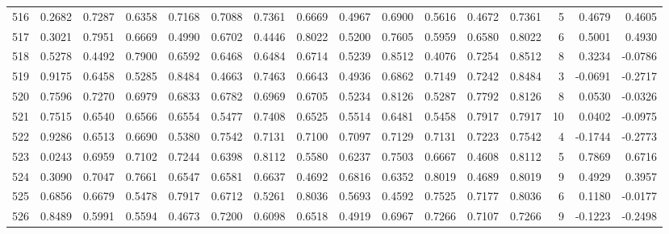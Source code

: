 \begin{tabular}{lrrrrrrrrrrrrrrr}
516 &      0.2682 &  0.7287 &  0.6358 &  0.7168 &  0.7088 &  0.7361 &  0.6669 &  0.4967 &  0.6900 &  0.5616 &   0.4672 &     0.7361 &      5 &                    0.4679 &                     0.4605 \\
517 &      0.3021 &  0.7951 &  0.6669 &  0.4990 &  0.6702 &  0.4446 &  0.8022 &  0.5200 &  0.7605 &  0.5959 &   0.6580 &     0.8022 &      6 &                    0.5001 &                     0.4930 \\
518 &      0.5278 &  0.4492 &  0.7900 &  0.6592 &  0.6468 &  0.6484 &  0.6714 &  0.5239 &  0.8512 &  0.4076 &   0.7254 &     0.8512 &      8 &                    0.3234 &                    -0.0786 \\
519 &      0.9175 &  0.6458 &  0.5285 &  0.8484 &  0.4663 &  0.7463 &  0.6643 &  0.4936 &  0.6862 &  0.7149 &   0.7242 &     0.8484 &      3 &                   -0.0691 &                    -0.2717 \\
520 &      0.7596 &  0.7270 &  0.6979 &  0.6833 &  0.6782 &  0.6969 &  0.6705 &  0.5234 &  0.8126 &  0.5287 &   0.7792 &     0.8126 &      8 &                    0.0530 &                    -0.0326 \\
521 &      0.7515 &  0.6540 &  0.6566 &  0.6554 &  0.5477 &  0.7408 &  0.6525 &  0.5514 &  0.6481 &  0.5458 &   0.7917 &     0.7917 &     10 &                    0.0402 &                    -0.0975 \\
522 &      0.9286 &  0.6513 &  0.6690 &  0.5380 &  0.7542 &  0.7131 &  0.7100 &  0.7097 &  0.7129 &  0.7131 &   0.7223 &     0.7542 &      4 &                   -0.1744 &                    -0.2773 \\
523 &      0.0243 &  0.6959 &  0.7102 &  0.7244 &  0.6398 &  0.8112 &  0.5580 &  0.6237 &  0.7503 &  0.6667 &   0.4608 &     0.8112 &      5 &                    0.7869 &                     0.6716 \\
524 &      0.3090 &  0.7047 &  0.7661 &  0.6547 &  0.6581 &  0.6637 &  0.4692 &  0.6816 &  0.6352 &  0.8019 &   0.4689 &     0.8019 &      9 &                    0.4929 &                     0.3957 \\
525 &      0.6856 &  0.6679 &  0.5478 &  0.7917 &  0.6712 &  0.5261 &  0.8036 &  0.5693 &  0.4592 &  0.7525 &   0.7177 &     0.8036 &      6 &                    0.1180 &                    -0.0177 \\
526 &      0.8489 &  0.5991 &  0.5594 &  0.4673 &  0.7200 &  0.6098 &  0.6518 &  0.4919 &  0.6967 &  0.7266 &   0.7107 &     0.7266 &      9 &                   -0.1223 &                    -0.2498 \\

\end{tabular}
